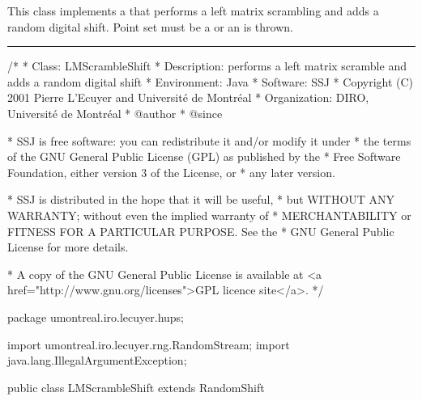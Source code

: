 
This class implements a
that performs a left matrix scrambling and adds a random digital
shift. Point set must be a
 or an
 is thrown.

\bigskip\hrule\bigskip

\begin{code}
\begin{hide}
/*
 * Class:        LMScrambleShift
 * Description:  performs a left matrix scramble and adds a random digital shift
 * Environment:  Java
 * Software:     SSJ 
 * Copyright (C) 2001  Pierre L'Ecuyer and Université de Montréal
 * Organization: DIRO, Université de Montréal
 * @author       
 * @since

 * SSJ is free software: you can redistribute it and/or modify it under
 * the terms of the GNU General Public License (GPL) as published by the
 * Free Software Foundation, either version 3 of the License, or
 * any later version.

 * SSJ is distributed in the hope that it will be useful,
 * but WITHOUT ANY WARRANTY; without even the implied warranty of
 * MERCHANTABILITY or FITNESS FOR A PARTICULAR PURPOSE.  See the
 * GNU General Public License for more details.

 * A copy of the GNU General Public License is available at
   <a href="http://www.gnu.org/licenses">GPL licence site</a>.
 */
\end{hide}
package umontreal.iro.lecuyer.hups;
\begin{hide}
 import umontreal.iro.lecuyer.rng.RandomStream;
 import java.lang.IllegalArgumentException;
\end{hide}

public class LMScrambleShift extends RandomShift \begin{hide} {
\end{hide}
\end{code}

